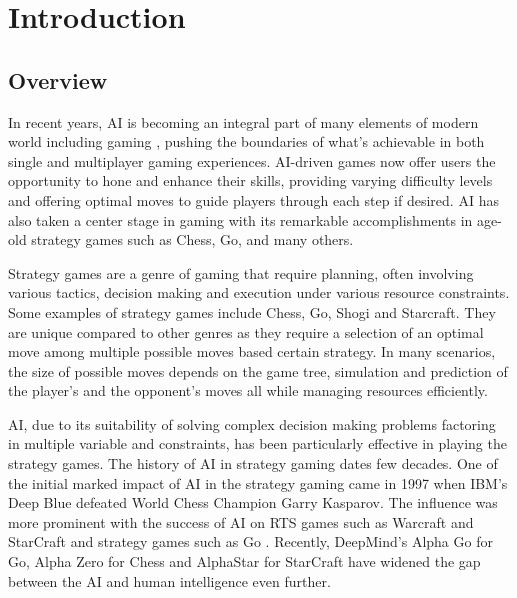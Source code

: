 \chapter{Introduction}

\section{Overview}
In recent years, \ac{AI} is becoming an integral part of many elements of modern world including gaming \citep{Skinner2010Artificial}, pushing the boundaries of what's achievable in both single and multiplayer gaming experiences. \ac{AI}-driven games now offer users the opportunity to hone and enhance their skills, providing varying difficulty levels and offering optimal moves to guide players through each step if desired. \ac{AI} has also taken a center stage in gaming with its remarkable accomplishments in age-old strategy games such as Chess, Go, and many others. 

% 

Strategy games are a genre of gaming that require planning, often involving various tactics, decision making and execution under various resource constraints. Some examples of strategy games include Chess, Go, Shogi and Starcraft. They are unique compared to other genres as they require a selection of an optimal move among multiple possible moves based certain strategy. In many scenarios, the size of possible moves depends on the game tree, simulation and prediction of the player's and the opponent's moves all while managing resources efficiently.

\ac{AI}, due to its suitability of solving complex decision making problems factoring in multiple variable and constraints, has been particularly effective in playing the strategy games. The history of \ac{AI} in strategy gaming dates few decades. One of the initial marked impact of \ac{AI} in the strategy gaming came in 1997 when IBM's Deep Blue \citep{Campbell2002Deep} defeated World Chess Champion Garry Kasparov. The influence was more prominent with the success of \ac{AI} on \ac{RTS} games such as Warcraft and StarCraft \citep{Robertson2014Review} and strategy games such as Go \citep{Huang2011Monte}. Recently, DeepMind's Alpha Go for Go, Alpha Zero for Chess \citep{Silver2017Mastering} and AlphaStar for StarCraft \citep{Team2019Alphastar} have widened the gap between the \ac{AI} and human intelligence even further.


